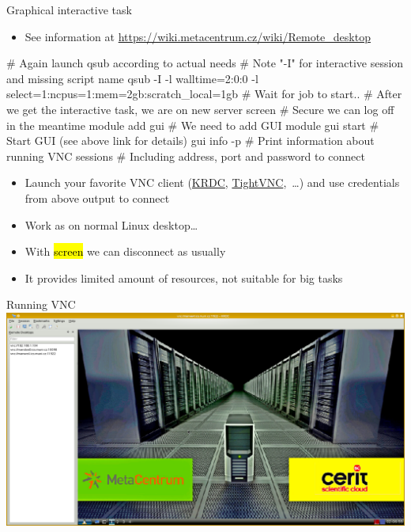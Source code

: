 \documentclass[compress, ucs, xelatex, 11pt, xcolor=svgnames,
  hyperref={
    bookmarks=true,
    unicode=true,
    colorlinks=true,
    pdftitle={Linux, command line and MetaCentrum},
    plainpages=false,
    pdfauthor={Vojtech Zeisek},
    pdfsubject={Course about use of Linux command line, writing shell scripts and using MetaCentrum of CESNET},
    pdfcreator={XeLaTeX},
    pdfkeywords={Linux, GNU, BASH, shell, command line, MetaCentrum},
    linkcolor=DarkRed,
    anchorcolor=DarkBlue,
    citecolor=Indigo,
    filecolor=NavyBlue,
    menucolor=DarkMagenta,
    urlcolor=DarkBlue,
    pdftex},
  url={hyphens, lowtilde} %
  ]{beamer}
\renewcommand{\texttt}[1]{\hl{\ttfamily #1}}
\begin{document}
\begin{frame}[fragile]{Graphical interactive task}
  \begin{itemize}
    \item See information at \url{https://wiki.metacentrum.cz/wiki/Remote_desktop}
  \end{itemize}
  \begin{bashcode}
    # Again launch qsub according to actual needs
    # Note "-I" for interactive session and missing script name
    qsub -I -l walltime=2:0:0 -l select=1:ncpus=1:mem=2gb:scratch_local=1gb
    # Wait for job to start..
    # After we get the interactive task, we are on new server
    screen # Secure we can log off in the meantime
    module add gui # We need to add GUI module
    gui start # Start GUI (see above link for details)
    gui info -p # Print information about running VNC sessions
                # Including address, port and password to connect
  \end{bashcode}
  \begin{itemize}
    \item Launch your favorite VNC client (\href{https://www.kde.org/applications/internet/krdc/}{KRDC}, \href{https://www.tightvnc.com/}{TightVNC},~\ldots) and use credentials from above output to connect
    \item Work as on normal Linux desktop\ldots
    \item With \texttt{screen} we can disconnect as usually
    \item It provides limited amount of resources, not suitable for big tasks
  \end{itemize}
\end{frame}

\begin{frame}{Running VNC}
  \includegraphics[width=\textwidth]{vnc.png}
\end{frame}
\end{document}
